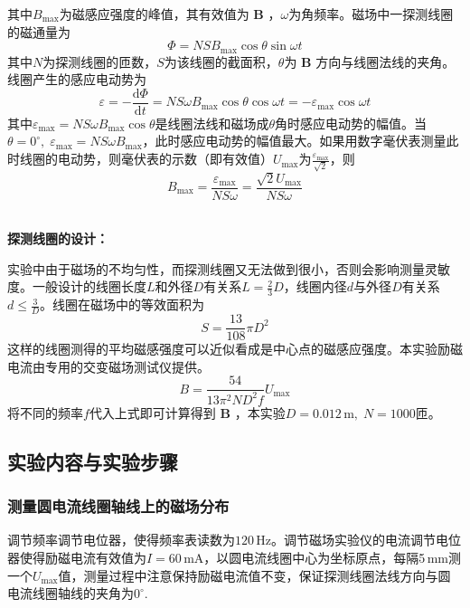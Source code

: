 \documentclass[UTF8]{article}
\theoremstyle{MyLineTheoremStyle} %
\theoremstyle{MyBlockTheoremStyle} %
\theoremstyle{MySubsubsectionStyle} %
\begin{document}
其中$ B_{\max} $为磁感应强度的峰值，其有效值为 $\boldsymbol{B}$ ，$ \omega $为角频率。磁场中一探测线圈的磁通量为
\begin{equation}
\Phi=NSB_{\max}\cos\theta\sin\omega t
\end{equation}
其中$ N $为探测线圈的匝数，$ S $为该线圈的截面积，$ \theta $为 $\boldsymbol{B}$ 方向与线圈法线的夹角。线圈产生的感应电动势为
\begin{equation}
\varepsilon=-\frac{\mathrm{d}\Phi}{\mathrm{d} t}=NS\omega B_{\max}\cos\theta\cos\omega t=-\varepsilon_{\max}\cos\omega t
\end{equation}
其中$ \varepsilon_{\max}=NS\omega B_{\max}\cos\theta $是线圈法线和磁场成$ \theta $角时感应电动势的幅值。当$ \theta=0^\circ,\;\varepsilon_{\max}=NS\omega B_{\max} $，此时感应电动势的幅值最大。如果用数字毫伏表测量此时线圈的电动势，则毫伏表的示数（即有效值）$ U_{\max} $为$ \frac{\varepsilon_{\max}}{\sqrt 2} $，则
\begin{equation}
B_{\max}=\frac{\varepsilon_{\max}}{NS\omega}=\frac{\sqrt 2U_{\max}}{NS\omega}
\end{equation}

~\\
\noindent \textbf{探测线圈的设计：}\par
实验中由于磁场的不均匀性，而探测线圈又无法做到很小，否则会影响测量灵敏度。一般设计的线圈长度$ L $和外径$ D $有关系$ L=\frac23D $，线圈内径$ d $与外径$ D $有关系$ d\leq\frac3D $。线圈在磁场中的等效面积为
\begin{equation}
S=\frac{13}{108}\pi D^2
\end{equation}
这样的线圈测得的平均磁感强度可以近似看成是中心点的磁感应强度。本实验励磁电流由专用的交变磁场测试仪提供。
\begin{equation}
B=\frac{54}{13\pi^2ND^2f}U_{\max}
\end{equation}
将不同的频率$ f $代入上式即可计算得到 $\boldsymbol{B}$ ，本实验$ D=0.012\,\mathrm m,\;N=1000 $匝。

\subsection{实验内容与实验步骤}
\subsubsection{测量圆电流线圈轴线上的磁场分布}
调节频率调节电位器，使得频率表读数为$ 120\,\mathrm{Hz} $。调节磁场实验仪的电流调节电位器使得励磁电流有效值为$ I=60\,\mathrm{mA} $，以圆电流线圈中心为坐标原点，每隔5\,mm测一个$ U_{\max} $值，测量过程中注意保持励磁电流值不变，保证探测线圈法线方向与圆电流线圈轴线的夹角为$ 0^\circ $.
\end{document}
